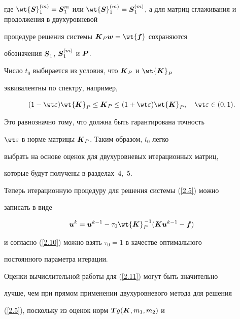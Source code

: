 где $\wt{\bi S}_1^{(m)}=\bi S^m_1$ или $\wt{\bi S}_1^{(m)}=\bi S


_1^{(m)}$, а для матриц сглаживания и продолжения в двухуровневой


процедуре решения системы $\bi K_P\bi w=\wt{\bi f}$ сохраняются


обозначения $\boldsymbol S_1$, $\boldsymbol S_1^{(m)}$ и $\boldsymbol P$.





Число $t_0$ выбирается из условия, что $\boldsymbol K_P$ и $\wt{\bi K}_P$


эквивалентны по спектру, например,


\begin{equation}\label{2.10}


(1-\wt\varepsilon)\wt{\bi K}_P\le\bi K_P\le(1+\wt\varepsilon)


\wt{\bi K}_P,\quad\wt\varepsilon\in(0,1).


\end{equation}


Это равнозначно тому, что должна быть гарантирована точность


$\wt\varepsilon$ в норме матрицы $\boldsymbol K_P$. Таким образом, $t_0$ легко


выбрать на основе оценок для двухуровневых итерационных матриц,


которые будут получены в разделах~4,~5.





Теперь итерационную процедуру для решения системы (\ref{2.5}) можно


записать в виде


\begin{equation}\label{2.11}


\bi u^k=\bi u^{k-1}-\tau_0\wt{\bi K}_P^{\,-1}


(\bi K \bi u^{k-1}-\bi f)


\end{equation}


и согласно (\ref{2.10}) можно взять $\tau_0=1$ в качестве оптимального


постоянного параметра итерации.





Оценки вычислительной работы для (\ref{2.11}) могут быть значительно


лучше, чем при прямом применении двухуровневого метода для решения


(\ref{2.5}), поскольку из оценок норм $\boldsymbol Tg(\boldsymbol K,m_1,m_2)$ и


